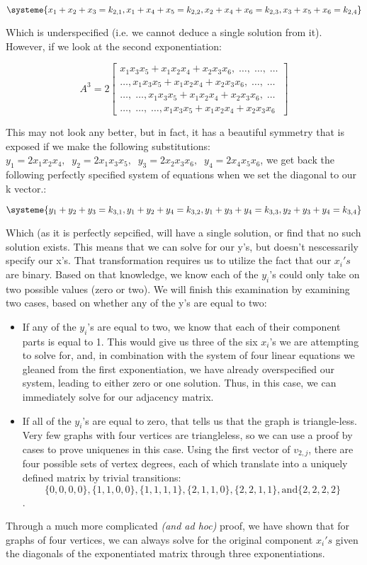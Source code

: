 \documentclass[a4paper,12pt]{article}
\begin{document}
\[\systeme{x_1 + x_2 + x_3 = k_{2,1} , x_1 + x_4 + x_5 = k_{2,2}, x_2 + x_4 + x_6 = k_{2,3}, x_3 + x_5 + x_6 = k_{2,4}}\]

Which is underspecified (i.e. we cannot deduce a single solution from it). However, if we look
at the second exponentiation:

\[ A^3 = 
2 \left[\begin{array}{cccc}
x_1 x_3 x_5 + x_1 x_2 x_ 4 + x_2 x_3 x_6 , \;\ldots , \;\ldots ,\; \ldots \\
\ldots, x_1 x_3 x_5 + x_1 x_2 x_ 4 + x_2 x_3 x_6,\; \ldots , \;\ldots \\
\ldots, \; \ldots, x_1 x_3 x_5 + x_1 x_2 x_ 4 + x_2 x_3 x_6 , \;\ldots \\
\ldots, \; \ldots, \;\ldots, x_1 x_3 x_5 + x_1 x_2 x_ 4 + x_2 x_3 x_6
\end{array} \right] 
\]

This may not look any better, but in fact, it has a beautiful symmetry that is exposed if we make the following 
substitutions: \(y_1 = 2 x_1 x_2 x_4,\;\;y_2 =  2 x_1 x_3 x_5,\;\;y_3 = 2 x_2 x_3 x_6,\;\;y_4 = 2 x_4 x_5 x_6\), we get
back the following perfectly specified system of equations when we set the diagonal to our k vector.:

\[\systeme{y_1 + y_2 + y_3 = k_{3,1} , y_1 + y_2 + y_4 = k_{3,2}, y_1 + y_3 + y_4 = k_{3,3}, y_2 + y_3 + y_4 = k_{3,4}}\]

Which (as it is perfectly sepcified, will have a single solution, or find that no such solution exists.  This means that we
can solve for our y's, but doesn't nescessarily specify our x's.  That transformation requires us to utilize the fact that
our \(x_i's\) are binary. Based on that knowledge, we know each of the \(y_i\)'s could only take on two possible values 
(zero or two). We will finish this examination by examining two cases, based on whether any of the y's are equal to two:
\begin{itemize}
\item If any of the \(y_i\)'s are equal to two, we know that each of their component parts is equal to 1. This would
give us three of the six \(x_i\)'s we are attempting to solve for, and, in combination with the system of four linear
equations we gleaned from the first exponentiation, we have already overspecified our system, leading to either
zero or one solution. Thus, in this case, we can immediately solve for our adjacency matrix.
\item If all of the \(y_i\)'s are equal to zero, that tells us that the graph is triangle-less. Very few graphs with four vertices are
triangleless, so we can use a proof by cases to prove uniquenes in this case. Using the first vector of \(v_{2,j}\), there are four possible
sets of vertex degrees, each of which translate into a uniquely defined matrix by trivial transitions: 
\[\{0, 0, 0, 0\}, \{1, 1, 0, 0\},\{1, 1, 1, 1\}, \{2, 1, 1, 0\},\{2, 2, 1, 1\}, \text{and} \{2, 2, 2, 2\}\].
\end{itemize}
Through a much more complicated \emph{(and ad hoc)} proof, we have shown that for graphs of four vertices, we can always solve
for the original component \(x_i's\) given the diagonals of the exponentiated matrix through three exponentiations.
\end{document}
